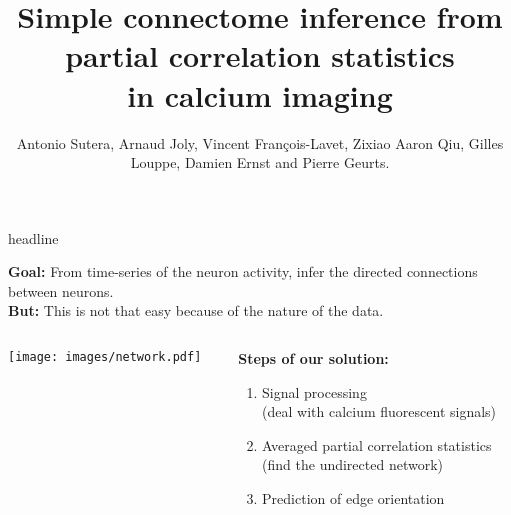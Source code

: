 \documentclass[final]{beamer}
\title{Simple connectome inference from partial correlation statistics\\in calcium imaging}
\author{{\footnotesize Antonio Sutera, Arnaud Joly, Vincent François-Lavet, Zixiao Aaron Qiu, Gilles Louppe, Damien Ernst and Pierre Geurts.}}
\date{}
\begin{document}

\begin{frame}

  \begin{beamercolorbox}[wd=\paperwidth, ignorebg]{headline}
    \begin{center}
      
    \end{center}
  \end{beamercolorbox}

\textbf{{\color{i6blue}Goal:}} From time-series of the neuron activity, infer the directed connections between neurons.\\[1.5ex]
\textbf{{\color{red}But:}} This is not that easy because of the nature of the data.\\[1.5ex]

\begin{columns}
\begin{column}{0.55\linewidth}
\texttt{[image: images/network.pdf]}
\end{column}
\begin{column}{0.5\linewidth}

\textbf{{\color{i6blue} Steps of our solution:}}
\begin{enumerate}
\item Signal processing\\{\scriptsize(deal with calcium fluorescent signals)}
\item Averaged partial correlation statistics\\{\scriptsize(find the undirected network)}
\item Prediction of edge orientation
\end{enumerate}


\end{column}
\end{columns}


\end{frame}
\end{document}
